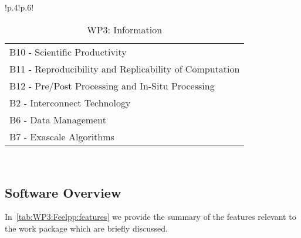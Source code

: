 \begin{table}[h!]
{{\begin{tabular}{!{\color{numpexgray}\vrule}p{.4\textwidth}!{\color{numpexgray}\vrule}p{.6\textwidth}!{\color{numpexgray}\vrule}}
\begin{tabular}{l}
B10 - Scientific Productivity\\
B11 - Reproducibility and Replicability of Computation\\
B12 - Pre/Post Processing and In-Situ Processing\\
B2 - Interconnect Technology\\
B6 - Data Management\\
B7 - Exascale Algorithms\\
\end{tabular} \\
        \bottomrule
    \end{tabular}
    }}
    \caption{WP3: \Feelpp Information}
\end{table}

\subsection{Software Overview}
\label{sec:WP3:Feelpp:summary}

In~\cref{tab:WP3:Feelpp:features} we provide the summary of the \Feelpp features relevant to the work package which are briefly discussed.

